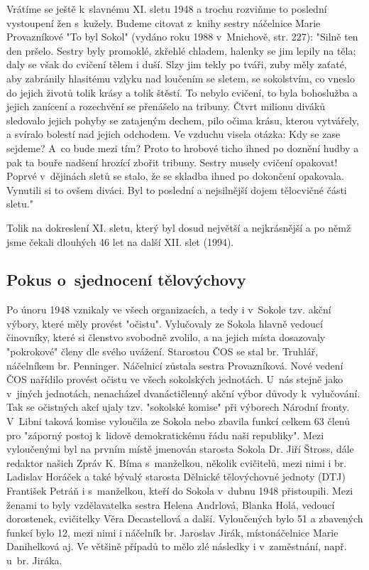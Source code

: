 \documentclass[a5paper, 12pt, twoside]{article}
\begin{document}
Vrátíme se ještě k~slavnému XI. sletu 1948 a trochu rozviňme to poslední
vystoupení žen s~kužely. Budeme citovat z~knihy sestry náčelnice Marie
Provazníkové "To byl Sokol" (vydáno roku 1988 v~Mnichově, str. 227):
"Silně ten den pršelo. Sestry byly promoklé, zkřehlé chladem, halenky se
jim lepily na těla; daly se však do cvičení tělem i duší. Slzy jim tekly
po tváři, zuby měly zaťaté, aby zabránily hlasitému vzlyku nad loučením
se sletem, se sokolstvím, co vneslo do jejich životů tolik krásy a tolik
štěstí. To nebylo cvičení, to byla bohoslužba a jejich zanícení a
rozechvění se přenášelo na tribuny. Čtvrt milionu diváků sledovalo
jejich pohyby se zatajeným dechem, pilo očima krásu, kterou vytvářely, a
svíralo bolestí nad jejich odchodem. Ve vzduchu visela otázka: Kdy se
zase sejdeme? A~co bude mezi tím? Proto to hrobové ticho ihned po
doznění hudby a pak ta bouře nadšení hrozící zbořit tribuny. Sestry
musely cvičení opakovat! Poprvé v~dějinách sletů se stalo, že se skladba
ihned po dokončení opakovala. Vynutili si to ovšem diváci. Byl to
poslední a nejsilnější dojem tělocvičné části sletu."

Tolik na dokreslení XI. sletu, který byl dosud největší a nejkrásnější a
po němž jsme čekali dlouhých 46 let na další XII. slet (1994).

\subsection{Pokus o~sjednocení
tělovýchovy}

Po únoru 1948 vznikaly ve všech organizacích, a tedy i v~Sokole tzv.
akční výbory, které měly provést "očistu". Vylučovaly ze Sokola hlavně
vedoucí činovníky, které si členstvo svobodně zvolilo, a na jejich místa
dosazovaly "pokrokové" členy dle svého uvážení. Starostou ČOS se stal
br. Truhlář, náčelníkem br. Penninger. Náčelnicí zůstala sestra
Provazníková. Nové vedení ČOS nařídilo provést očistu ve všech
sokolských jednotách. U~nás stejně jako v~jiných jednotách, nenacházel
dvanáctičlenný akční výbor důvody k~vylučování. Tak se očistných akcí
ujaly tzv. "sokolské komise" při výborech Národní fronty. V~Libni
taková komise vyloučila ze Sokola nebo zbavila funkcí celkem 63 členů
pro "záporný postoj k~lidově demokratickému řádu naši republiky". Mezi
vyloučenými byl na prvním místě jmenován starosta Sokola Dr. Jiří
Štross, dále redaktor našich Zpráv K. Bíma s~manželkou, několik
cvičitelů, mezi nimi i br. Ladislav Horáček a také bývalý starosta
Dělnické tělovýchovné jednoty (DTJ) František Petráň i s~manželkou,
kteří do Sokola v~dubnu 1948 přistoupili. Mezi ženami to byly
vzdělavatelka sestra Helena Andrlová, Blanka Holá, vedoucí dorostenek,
cvičitelky Věra Decastellová a další. Vyloučených bylo 51 a zbavených
funkcí bylo 12, mezi nimi i náčelník br. Jaroslav Jirák, místonáčelnice
Marie Danihelková aj. Ve většině případů to mělo zlé následky i
v~zaměstnání, např. u~br. Jiráka.
\end{document}
